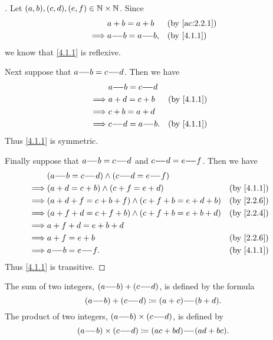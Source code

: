\begin{proof}[]
  Let \((a, b), (c, d), (e, f) \in \mathbb{N} \times \mathbb{N}\).
  Since
  \begin{align*}
             & a + b = a + b      &  & \by{ac:2.2.1} \\
    \implies & a \mm b = a \mm b, &  & \by{4.1.1}
  \end{align*}
  we know that \cref{4.1.1} is reflexive.

  Next suppose that \(a {-}\!{-} b = c {-}\!{-} d\).
  Then we have
  \begin{align*}
             & a \mm b = c \mm d                  \\
    \implies & a + d = c + b      &  & \by{4.1.1} \\
    \implies & c + b = a + d                      \\
    \implies & c \mm d = a \mm b. &  & \by{4.1.1}
  \end{align*}
  Thus \cref{4.1.1} is symmetric.

  Finally suppose that \(a {-}\!{-} b = c {-}\!{-} d\) and \(c {-}\!{-} d = e {-}\!{-} f\).
  Then we have
  \begin{align*}
             & (a \mm b = c \mm d) \land (c \mm d = e \mm f)                         \\
    \implies & (a + d = c + b) \land (c + f = e + d)                 &  & \by{4.1.1} \\
    \implies & (a + d + f = c + b + f) \land (c + f + b = e + d + b) &  & \by{2.2.6} \\
    \implies & (a + f + d = c + f + b) \land (c + f + b = e + b + d) &  & \by{2.2.4} \\
    \implies & a + f + d = e + b + d                                                 \\
    \implies & a + f = e + b                                         &  & \by{2.2.6} \\
    \implies & a \mm b = e \mm f.                                    &  & \by{4.1.1}
  \end{align*}
  Thus \cref{4.1.1} is transitive.
\end{proof}

\begin{defn}\label{4.1.2}
  The sum of two integers, \((a {-}\!{-} b) + (c {-}\!{-} d)\), is defined by the formula
  \[
    (a {-}\!{-} b) + (c {-}\!{-} d) \coloneqq (a + c) {-}\!{-} (b + d).
  \]
  The product of two integers, \((a {-}\!{-} b) \times (c {-}\!{-} d)\), is defined by
  \[
    (a {-}\!{-} b) \times (c {-}\!{-} d) \coloneqq (ac + bd) {-}\!{-} (ad + bc).
  \]
\end{defn}

